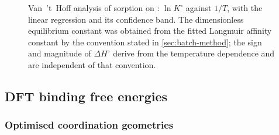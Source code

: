 \begin{figure}[htbp]
  \centering
  \caption[Van~'t~Hoff analysis of \PbII{} sorption]{Van~'t~Hoff analysis of \PbII{} sorption on \TAOSS{}: $\ln K^{\circ}$ against $1/T$, with the linear regression and its confidence band. The dimensionless equilibrium constant was obtained from the fitted Langmuir affinity constant by the convention stated in \cref{sec:batch-method}; the sign and magnitude of $\Delta H^{\circ}$ derive from the temperature dependence and are independent of that convention.}
  \label{fig:vant-hoff}
\end{figure}

\begin{table}[htbp]
  \centering
  \caption[Thermodynamic parameters]{Thermodynamic parameters for \PbII{} sorption on \TAOSS{}: $\Delta H^{\circ}$, $\Delta S^{\circ}$ and $\Delta G^{\circ}$ at each temperature, with uncertainties propagated from the van~'t~Hoff regression and the regression $R^2$. The convention used to render the equilibrium constant dimensionless is stated in \cref{sec:batch-method}.}
  \label{tab:thermo}
\end{table}



\subsection{DFT binding free energies}
\label{sec:results-dft}

\subsubsection{Optimised coordination geometries}
\label{sec:results-geometries}

